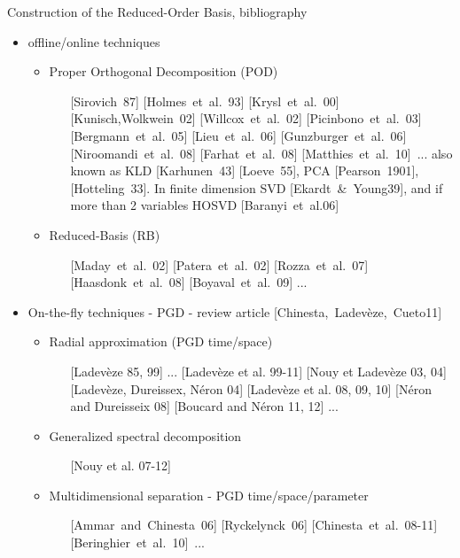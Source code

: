 \documentclass[12pt]{beamer}
\newcommand\FontBiblio{\fontsize{8.5}{10}\selectfont}
\newcommand\FontBiblioT{\fontsize{9.5}{11}\selectfont}
\begin{document}
\begin{frame}%
Construction of the Reduced-Order Basis, bibliography

\FontBiblioT
\begin{itemize}   
	\item offline/online techniques
		\begin{itemize}
			\FontBiblio
			\item Proper Orthogonal Decomposition (POD) %
				\begin{itemize}%
					\FontBiblio
					\item[] [Sirovich~87] [Holmes~et~al.~93] [Krysl~et~al.~00] [Kunisch,Wolkwein~02]
					[Willcox~et~al.~02] [Picinbono~et~al.~03] [Bergmann~et~al.~05] [Lieu~et~al.~06] 
					[Gunzburger~et~al.~06] [Niroomandi~et~al.~08] [Farhat~et~al.~08] [Matthies~et~al.~10]~...
					also known as KLD [Karhunen~43] [Loeve~55], PCA [Pearson~1901], [Hotteling~33]. 
					In finite dimension SVD [Ekardt~\&~Young39], and if more than 2 variables HOSVD [Baranyi~et~al.06]		
				\end{itemize}
			\item Reduced-Basis (RB)
				\begin{itemize}
					\FontBiblio
					\item[] [Maday~et~al.~02] [Patera~et~al.~02] [Rozza~et~al.~07] [Haasdonk~et~al.~08] [Boyaval~et~al.~09] ...				
				\end{itemize}			
		\end{itemize}
		\vspace{-0.2cm}
					\FontBiblioT
		\item On-the-fly techniques - PGD - review article [Chinesta,~Ladevèze,~Cueto11]
					\FontBiblio
			\begin{itemize}
					\FontBiblio
				\item Radial approximation (PGD time/space)
				\begin{itemize}
					\FontBiblio
					\item[] [Ladevèze 85, 99] ... [Ladevèze et al. 99-11] [Nouy et Ladevèze 03, 04] [Ladevèze, Dureissex, Néron 04]
					[Ladevèze et al. 08, 09, 10] [Néron and Dureisseix 08] [Boucard and Néron 11, 12] ...
				\end{itemize}	
					\item Generalized spectral decomposition
						\begin{itemize}
						\FontBiblio
						\item[]  [Nouy et al. 07-12]
						\end{itemize}
					\FontBiblio
					\item Multidimensional separation - PGD time/space/parameter
						\begin{itemize}
						\FontBiblio
						\item[] [Ammar~and~Chinesta~06] [Ryckelynck~06] [Chinesta~et~al.~08-11] [Beringhier~et~al.~10]~...
						\end{itemize}						


\end{itemize}
\end{itemize}
\end{frame}
\end{document}
